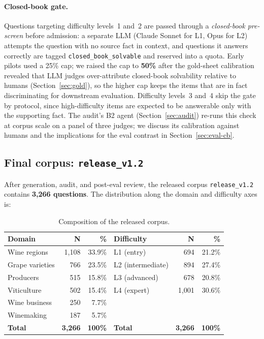 \paragraph{Closed-book gate.} Questions targeting difficulty levels~1
and~2 are passed through a \emph{closed-book pre-screen} before
admission: a separate LLM (Claude Sonnet for L1, Opus for L2) attempts
the question with no source fact in context, and questions it answers
correctly are tagged \texttt{closed\_book\_solvable} and reserved into
a quota. Early pilots used a 25\% cap; we raised the cap to
\textbf{50\%} after the gold-sheet calibration revealed that LLM judges
over-attribute closed-book solvability relative to humans
(Section~\ref{sec:gold}), so the higher cap keeps the items that are
in fact discriminating for downstream evaluation. Difficulty levels~3
and~4 skip the gate by protocol, since high-difficulty items are
expected to be answerable only with the supporting fact. The audit's B2 agent
(Section~\ref{sec:audit}) re-runs this check at corpus scale on a panel
of three judges; we discuss its calibration against humans and the
implications for the eval contrast in Section~\ref{sec:eval-cb}.

\subsection{Final corpus: \texttt{release\_v1.2}}
\label{sec:release}
After generation, audit, and post-eval review, the released corpus
\texttt{release\_v1.2} contains \textbf{3{,}266 questions}. The
distribution along the domain and difficulty axes is:

\begin{table}[h]
  \centering
  \caption{Composition of the released corpus.}
  \label{tab:corpus}
  \small
  \begin{tabular}{lrrlrr}
    \toprule
    Domain & N & \% & Difficulty & N & \% \\
    \midrule
    Wine regions     & 1{,}108 & 33.9\% & L1 (entry)        & 694   & 21.2\% \\
    Grape varieties  & 766     & 23.5\% & L2 (intermediate) & 894   & 27.4\% \\
    Producers        & 515     & 15.8\% & L3 (advanced)     & 678   & 20.8\% \\
    Viticulture      & 502     & 15.4\% & L4 (expert)       & 1{,}001 & 30.6\% \\
    Wine business    & 250     &  7.7\% &                   &       &       \\
    Winemaking       & 187     &  5.7\% &                   &       &       \\
    \midrule
    \textbf{Total}   & \textbf{3{,}266} & \textbf{100\%}
                     & \textbf{Total}   & \textbf{3{,}266} & \textbf{100\%} \\
    \bottomrule
  \end{tabular}
\end{table}

